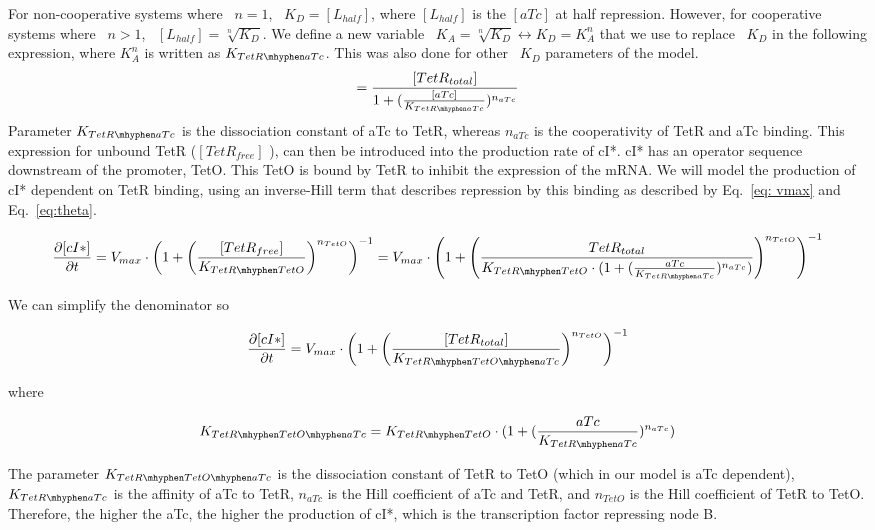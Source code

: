 For non-cooperative systems where ~$n=1$, ~$K_{D}=[L_{half}]$, where $[L_{half}]$ is the $[aTc]$ at half repression.
However, for cooperative systems where ~$n>1$, ~$[L_{half}] = \sqrt[n]{K_{D}}$.
We define a new variable ~$K_{A} = \sqrt[n]{K_{D}} \leftrightarrow K_{D} = K^n_{A}$
that we use to replace ~$K_{D}$ in the following expression,
where $K^n_{A}$ is written as $K_{TetR \mhyphen aTc}$.
This was also done for other ~$K_{D}$ parameters of the model.
\begin{equation}
[TetR_{free}] =  \frac{[TetR_{total}]}{1+(\frac{[aTc]}{K_{TetR \mhyphen aTc}})^{n_{aTc}}}
\end{equation}
Parameter $K_{TetR \mhyphen aTc}$ is the dissociation constant of aTc to TetR,
whereas $n_{aTc}$ is the cooperativity of TetR and aTc binding.
This expression for unbound TetR ($[TetR_{free}]$ ), can then be introduced into the production rate of cI*.
cI* has an operator sequence downstream of the promoter, TetO.
This TetO is bound by TetR to inhibit the expression of the mRNA.
We will model the production of cI* dependent on TetR binding,
using an inverse-Hill term
that describes repression by this binding as described by Eq.~\ref{eq: vmax} and Eq.~\ref{eq:theta}.

\begin{equation}
    \pdv{[cI*]}{t} = V_{max}\cdot \left(1+\left(\frac{[TetR_{free}]}{K_{TetR \mhyphen TetO}}\right)^{n_{TetO}}\right)^{-1} = V_{max} \cdot \left(1+\left(\frac{TetR_{total}}{K_{TetR \mhyphen TetO}\cdot(1+(\frac{aTc}{K_{TetR \mhyphen aTc}})^{n_{aTc}})}\right)^{n_{TetO}}\right)^{-1}
\end{equation}

We can simplify the denominator so

\begin{equation}
    \pdv{[cI*]}{t} = V_{max}\cdot \left(1+\left(\frac{[TetR_{total}]}{K_{TetR \mhyphen TetO \mhyphen aTc }}\right)^{n_{TetO}}\right)^{-1}
\end{equation}

where

\begin{equation}
    K_{TetR \mhyphen TetO \mhyphen aTc}=K_{TetR \mhyphen TetO}\cdot(1+(\frac{aTc}{K_{TetR \mhyphen aTc}})^{n_{aTc}})
\end{equation}

The parameter $K_{TetR \mhyphen TetO \mhyphen aTc}$ is the dissociation constant of TetR to TetO (which in our model is aTc dependent), $K_{TetR \mhyphen aTc}$
is the affinity of aTc to TetR, $n_{aTc}$ is the Hill coefficient of aTc and TetR,
and $n_{TetO}$ is the Hill coefficient of TetR to TetO.
Therefore, the higher the aTc, the higher the production of cI*, which is the transcription factor repressing node B.

